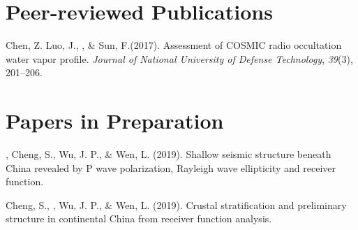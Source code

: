 \newcommand{\Revision}{\textit{under revision}}
\newcommand{\CS}{*} %
\newcommand{\CF}{\textsuperscript{\#}} %


\section*{Peer-reviewed Publications}

\begin{etaremune}
\item
    Chen, Z. Luo, J.,  \Xiao, \& Sun, F.(2017).
    Assessment of COSMIC radio occultation water vapor profile.
    \textit{Journal of National University of Defense Technology}, \textit{39}(3), 201--206.
\end{etaremune}

\section*{Papers in Preparation}
\begin{etaremune}
\item
    \Xiao, Cheng, S., Wu, J. P., \& Wen, L. (2019).
    Shallow seismic structure beneath China revealed by P wave polarization, Rayleigh wave ellipticity and receiver function.
\item
    Cheng, S., \Xiao, Wu, J. P., \& Wen, L. (2019).
    Crustal stratification and preliminary structure in continental China from receiver function analysis. 
\end{etaremune}

